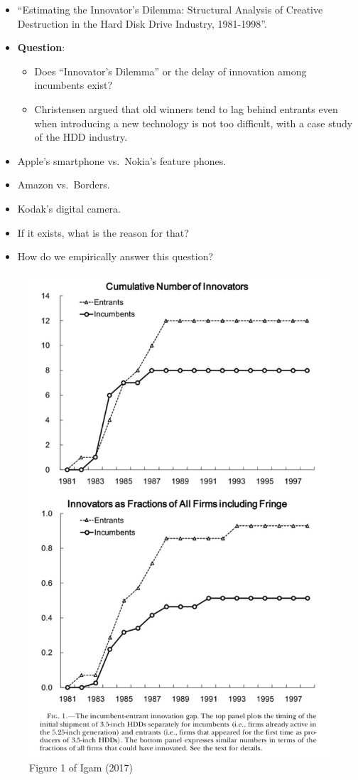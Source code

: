 \documentclass[
]{book}
\providecommand{\tightlist}{%
  \setlength{\itemsep}{0pt}\setlength{\parskip}{0pt}}
\begin{document}
\begin{itemize}
\item
  \citet{Igami2017} ``Estimating the Innovator's Dilemma: Structural Analysis of Creative Destruction in the Hard Disk Drive Industry, 1981-1998''.
\item
  \textbf{Question}:

  \begin{itemize}
  \tightlist
  \item
    Does ``Innovator's Dilemma'' \citep{Christensen1997} or the delay of innovation among incumbents exist?
  \item
    Christensen argued that old winners tend to lag behind entrants even when introducing a new technology is not too difficult, with a case study of the HDD industry.
  \end{itemize}
\item
  Apple's smartphone vs.~Nokia's feature phones.
\item
  Amazon vs.~Borders.
\item
  Kodak's digital camera.
\item
  If it exists, what is the reason for that?
\item
  How do we empirically answer this question?
\end{itemize}

\begin{figure}

{\centering \includegraphics[width=0.8\linewidth]{figuretable/Igam2017Fig1} 

}

\caption{Figure 1 of Igam (2017)}\label{fig:unnamed-chunk-2}
\end{figure}
\end{document}
